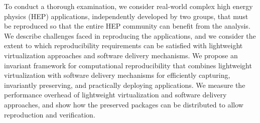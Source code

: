 To conduct a thorough examination, we consider real-world complex high energy physics (HEP) applications, independently developed by two groups, that must be reproduced so that the entire HEP community can benefit from the analysis. We describe challenges faced in reproducing the applications, and we consider the extent to which reproducibility requirements can be satisfied with lightweight virtualization approaches and software delivery mechanisms. We propose an invariant framework for computational reproducibility that combines lightweight virtualization with software delivery mechanisms for efficiently capturing, invariantly preserving, and practically deploying applications. We measure the performance overhead of lightweight virtualization and software delivery approaches, and show how the preserved packages can be distributed to allow reproduction and verification.

